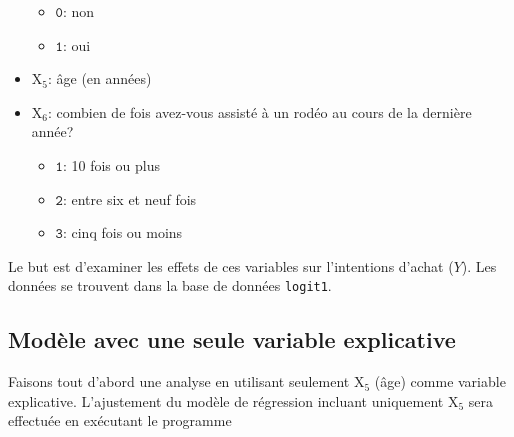 \documentclass[
  11pt,
  letterpaper,
]{book}
\providecommand{\tightlist}{%
  \setlength{\itemsep}{0pt}\setlength{\parskip}{0pt}}\usepackage{longtable,booktabs,array}
\theoremstyle{definition}
\theoremstyle{remark}
\begin{document}
\begin{itemize}
  \begin{itemize}
  \tightlist
  \item
    \(\texttt{0}\): non
  \item
    \(\texttt{1}\): oui
  \end{itemize}
\item
  \(\mathrm{X}_5\): âge (en années)
\item
  \(\mathrm{X}_6\): combien de fois avez-vous assisté à un rodéo au
  cours de la dernière année?

  \begin{itemize}
  \tightlist
  \item
    \(\texttt{1}\): 10 fois ou plus
  \item
    \(\texttt{2}\): entre six et neuf fois
  \item
    \(\texttt{3}\): cinq fois ou moins
  \end{itemize}
\end{itemize}

Le but est d'examiner les effets de ces variables sur l'intentions
d'achat (\(Y\)). Les données se trouvent dans la base de données
\texttt{logit1}.

\hypertarget{moduxe8le-avec-une-seule-variable-explicative}{%
\subsection{Modèle avec une seule variable
explicative}\label{moduxe8le-avec-une-seule-variable-explicative}}

Faisons tout d'abord une analyse en utilisant seulement \(\mathrm{X}_5\)
(âge) comme variable explicative. L'ajustement du modèle de régression
incluant uniquement \(\mathrm{X}_5\) sera effectuée en exécutant le
programme
\end{document}
